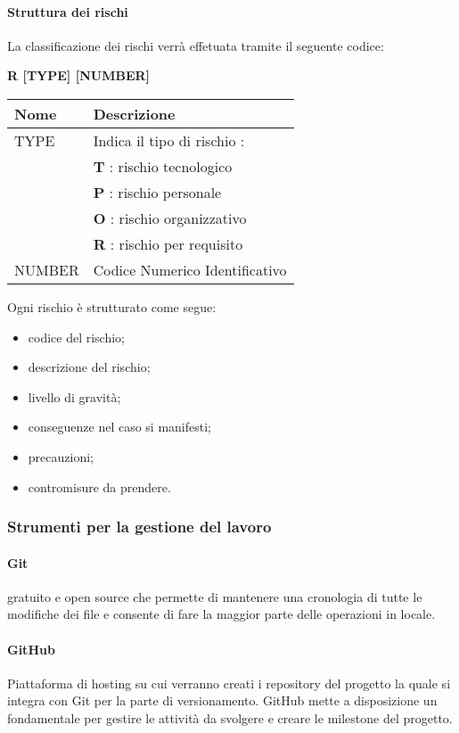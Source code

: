 \paragraph{Struttura dei rischi} \hfill \break
La classificazione dei rischi verrà effetuata tramite il seguente codice:
\begin{center}
    \textbf{R [TYPE] [NUMBER]}
\end{center}
\begin{center}
    \renewcommand{\arraystretch}{1.8} %
    \begin{tabular}{ |m{7em}|m{30em}| }
        \hline
        \textbf{Nome} & \textbf{Descrizione} \\
        \hline
        TYPE & Indica il tipo di rischio :\\
             & \textbf{T} : rischio tecnologico\\
             & \textbf{P} : rischio personale\\
             & \textbf{O} : rischio organizzativo\\
             & \textbf{R} : rischio per requisito\\
        \hline
        NUMBER & Codice Numerico Identificativo\\
        \hline
    \end{tabular}
\end{center}
Ogni rischio è strutturato come segue:
\begin{itemize}
    \item codice del rischio;
    \item descrizione del rischio;
    \item livello di gravità;
    \item conseguenze nel caso si manifesti;
    \item precauzioni;
    \item contromisure da prendere.
\end{itemize}

\subsubsection{Strumenti per la gestione del lavoro}
\paragraph{Git} \hfill \break
{} gratuito e open source che permette di mantenere una cronologia di tutte le modifiche dei file e consente
di fare la maggior parte delle operazioni in locale.

\paragraph{GitHub} \hfill \break
Piattaforma di hosting su cui verranno creati i repository del progetto la quale si integra con Git per la parte di versionamento. 
GitHub mette a disposizione un  fondamentale per gestire le attività da svolgere e creare le milestone del progetto.